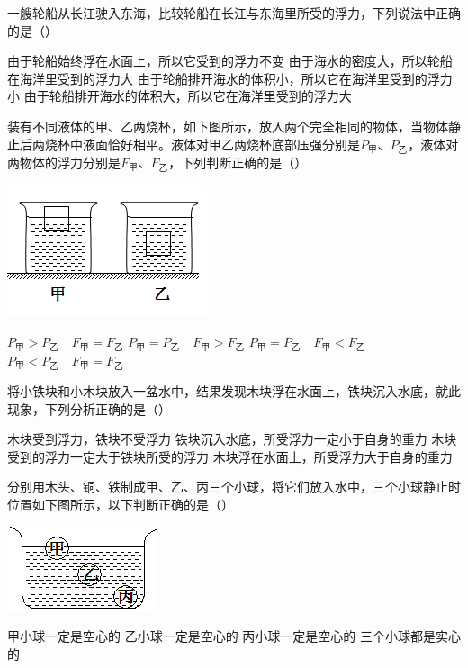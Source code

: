 \documentclass[12pt,twoside]{exam}
\begin{document}
\begin{knowledge}
\begin{questions}
\question
一艘轮船从长江驶入东海，比较轮船在长江与东海里所受的浮力，下列说法中正确的是（\answerline*[A]）
\begin{choices}
\choice 由于轮船始终浮在水面上，所以它受到的浮力不变
\choice 由于海水的密度大，所以轮船在海洋里受到的浮力大
\choice 由于轮船排开海水的体积小，所以它在海洋里受到的浮力小
\choice 由于轮船排开海水的体积大，所以它在海洋里受到的浮力大
\end{choices}


\question
装有不同液体的甲、乙两烧杯，如下图所示，放入两个完全相同的物体，当物体静止后两烧杯中液面恰好相平。液体对甲乙两烧杯底部压强分别是$P_\textrm{甲}$、$P_\textrm{乙}$，液体对两物体的浮力分别是$F_\textrm{甲}$、$F_\textrm{乙}$，下列判断正确的是（\answerline*[A]）
\begin{multicols}{2}
\includegraphics[scale=1]{figures/图片14.png} 
\columnbreak
\begin{choices}
\choice $P_\textrm{甲} > P_\textrm{乙}   \quad   F_\textrm{甲}=F_\textrm{乙}$ 
\choice $P_\textrm{甲} = P_\textrm{乙}   \quad   F_\textrm{甲}>F_\textrm{乙}$ 
\choice $P_\textrm{甲} = P_\textrm{乙}   \quad   F_\textrm{甲}<F_\textrm{乙}$ 
\choice $P_\textrm{甲} < P_\textrm{乙}   \quad   F_\textrm{甲}=F_\textrm{乙}$ 
\end{choices}
\end{multicols}


\question
将小铁块和小木块放入一盆水中，结果发现木块浮在水面上，铁块沉入水底，就此现象，下列分析正确的是（\answerline*[B]）
\begin{choices}
\choice 木块受到浮力，铁块不受浮力
\choice 铁块沉入水底，所受浮力一定小于自身的重力
\choice 木块受到的浮力一定大于铁块所受的浮力
\choice 木块浮在水面上，所受浮力大于自身的重力
\end{choices}


\question
分别用木头、铜、铁制成甲、乙、丙三个小球，将它们放入水中，三个小球静止时位置如下图所示，以下判断正确的是（\answerline*[B]）
\begin{multicols}{2}
\includegraphics[scale=1]{figures/图片16.png} 
\columnbreak
\begin{choices}
\choice 甲小球一定是空心的
\choice 乙小球一定是空心的
\choice 丙小球一定是空心的
\choice 三个小球都是实心的
\end{choices}
\end{multicols}



\end{questions}
\end{knowledge}
\end{document}
